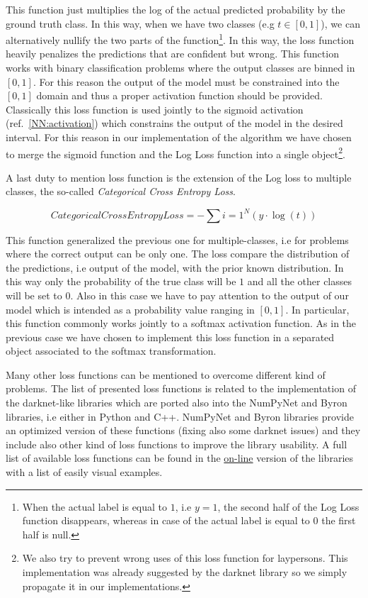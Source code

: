 \documentclass{standalone}
\begin{document}
This function just multiplies the log of the actual predicted probability by the ground truth class.
In this way, when we have two classes (e.g $t \in [0, 1]$), we can alternatively nullify the two parts of the function\footnote{
  When the actual label is equal to $1$, i.e $y=1$, the second half of the Log Loss function disappears, whereas in case of the actual label is equal to $0$ the first half is null.
}.
In this way, the loss function heavily penalizes the predictions that are confident but wrong.
This function works with binary classification problems where the output classes are binned in $[0, 1]$.
For this reason the output of the model must be constrained into the $[0, 1]$ domain and thus a proper activation function should be provided.
Classically this loss function is used jointly to the sigmoid activation (ref.~\ref{NN:activation}) which constrains the output of the model in the desired interval.
For this reason in our implementation of the algorithm we have chosen to merge the sigmoid function and the Log Loss function into a single object\footnote{
  We also try to prevent wrong uses of this loss function for laypersons.
  This implementation was already suggested by the \textsf{darknet} library so we simply propagate it in our implementations.
}.

A last duty to mention loss function is the extension of the Log loss to multiple classes, the so-called \emph{Categorical Cross Entropy Loss}.

\begin{equation}
CategoricalCrossEntropyLoss = -\sum{i=1}^{N}\left( y\cdot\log(t) \right)
\end{equation}

This function generalized the previous one for multiple-classes, i.e for problems where the correct output can be only one.
The loss compare the distribution of the predictions, i.e output of the model, with the prior known distribution.
In this way only the probability of the true class will be $1$ and all the other classes will be set to $0$.
Also in this case we have to pay attention to the output of our model which is intended as a probability value ranging in $[0, 1]$.
In particular, this function commonly works jointly to a softmax activation function.
As in the previous case we have chosen to implement this loss function in a separated object associated to the softmax transformation.

Many other loss functions can be mentioned to overcome different kind of problems.
The list of presented loss functions is related to the implementation of the \textsf{darknet}-like libraries which are ported also into the \textsf{NumPyNet} and \textsf{Byron} libraries, i.e either in \textsf{Python} and \textsf{C++}.
\textsf{NumPyNet} and \textsf{Byron} libraries provide an optimized version of these functions (fixing also some \textsf{darknet} issues) and they include also other kind of loss functions to improve the library usability.
A full list of available loss functions can be found in the \href{https://github.com/Nico-Curti/Byron/blob/master/src/cost_layer.cpp}{on-line} version of the libraries with a list of easily visual examples.
\end{document}
